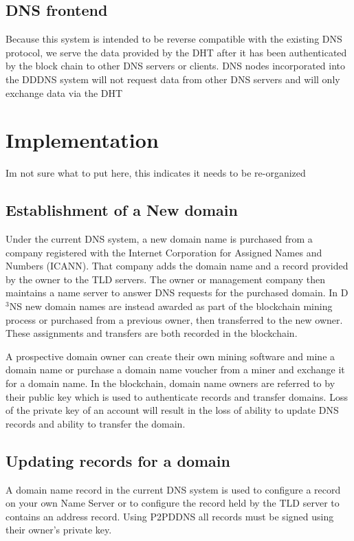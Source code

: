 \documentclass[11pt]{IEEEtran} %
\begin{document}
\subsection{DNS frontend}
Because this system is intended to be reverse compatible with the existing DNS protocol, we serve the data provided by the DHT after it has been authenticated by the block chain to other DNS servers or clients. DNS nodes incorporated into the DDDNS system will not request data from other DNS servers and will only exchange data via the DHT 

\section{Implementation}
Im not sure what to put here, this indicates it needs to be re-organized
\subsection{Establishment of a New domain}
Under the current DNS system, a new domain name is purchased from a company registered with the Internet Corporation for Assigned Names and Numbers (ICANN). That company adds the domain name and a record provided by the owner to the TLD servers. The owner or management company then maintains a name server to answer DNS requests for the purchased domain. In D$^{3}$NS new domain names are instead awarded as part of the blockchain mining process or purchased from a previous owner, then transferred to the new owner. These assignments and transfers are both recorded in the blockchain. 

A prospective domain owner can create their own mining software and mine a domain name or purchase a domain name voucher from a miner and exchange it for a domain name. In the blockchain, domain name owners are referred to by their public key which is used to authenticate records and transfer domains. Loss of the private key of an account will result in the loss of ability to update DNS records and ability to transfer the domain. 

\subsection{Updating records for a domain}
A domain name record in the current DNS system is used to configure a record on your own Name Server or to configure the record held by the TLD server to contains an address record. Using P2PDDNS all records must be signed using their owner's private key. 
\end{document}
